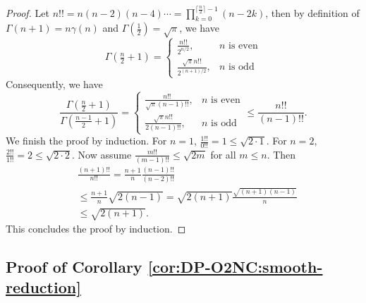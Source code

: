 \begin{proof}
Let $n!! = n(n-2)(n-4)\dotsm = \prod_{k=0}^{\lceil\frac{n}{2}\rceil-1} (n-2k)$, then by definition of $\Gamma(n+1)=n\gamma(n)$ and $\Gamma(\frac{1}{2})=\sqrt{\pi}$, we have
\begin{equation*}
    \Gamma(\tfrac{n}{2}+1) = 
    \left\{
    \begin{array}{ll}
        \frac{n!!}{2^{n/2}}, & \text{$n$ is even} \\
        \frac{\sqrt{\pi}n!!}{2^{(n+1)/2}}, & \text{$n$ is odd}
    \end{array}
    \right.
\end{equation*}
Consequently, we have
\begin{equation*}
    \frac{\Gamma(\tfrac{n}{2}+1)}{\Gamma(\frac{n-1}{2}+1)} = 
    \left\{
    \begin{array}{ll}
        \frac{n!!}{\sqrt{\pi}(n-1)!!}, & \text{$n$ is even} \\
        \frac{\sqrt{\pi}n!!}{2(n-1)!!}, & \text{$n$ is odd}
    \end{array}
    \right.
    \le \frac{n!!}{(n-1)!!}.
\end{equation*}
We finish the proof by induction. For $n=1$, $\frac{1!!}{0!!} = 1 \le \sqrt{2\cdot 1}$. For $n=2$, $\frac{2!!}{1!!}=2 \le \sqrt{2\cdot 2}$. Now assume $\frac{m!!}{(m-1)!!} \le \sqrt{2m}$ for all $m\le n$. Then
\begin{align*}
    &\frac{(n+1)!!}{n!!} = \frac{n+1}{n} \frac{(n-1)!!}{(n-2)!!} \\
    &\le \frac{n+1}{n} \sqrt{2(n-1)} = \sqrt{2(n+1)}\frac{\sqrt{(n+1)(n-1)}}{n} \\
    &\le \sqrt{2(n+1)}.
\end{align*}
This concludes the proof by induction.
\end{proof}


\subsection{Proof of Corollary \ref{cor:DP-O2NC:smooth-reduction}}


